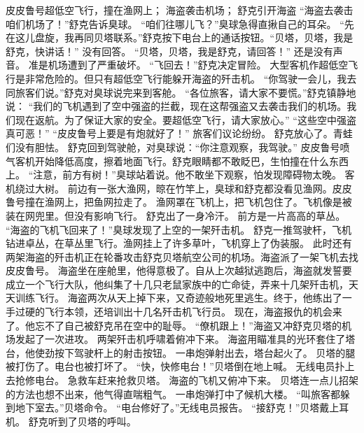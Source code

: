 \documentclass[a4paper,12pt,UTF8,twoside]{ctexbook}
\begin{document}
        皮皮鲁号超低空飞行，撞在渔网上； 
        海盗袭击机场； 
        舒克引开海盗   
        “海盗去袭击咱们机场了！”舒克告诉臭球。 
        “咱们往哪儿飞？”臭球急得直揪自己的耳朵。 
        “先在这儿盘旋，我再同贝塔联系。”舒克按下电台上的通话按钮。“贝塔，贝塔，我是舒克，快讲话！” 
        没有回答。 
        “贝塔，贝塔，我是舒克，请回答！” 
        还是没有声音。 
        准是机场遭到了严重破坏。 
        “飞回去！”舒克决定冒险。 
        大型客机作超低空飞行是非常危险的。但只有超低空飞行能躲开海盗的歼击机。 
        “你驾驶一会儿，我去同旅客们说。”舒克对臭球说完来到客舱。 
        “各位旅客，请大家不要慌。”舒克镇静地说： 
        “我们的飞机遇到了空中强盗的拦截，现在这帮强盗又去袭击我们的机场。我们现在返航。为了保证大家的安全。要超低空飞行，请大家放心。” 
        “这些空中强盗真可恶！” 
        “皮皮鲁号上要是有炮就好了！” 
        旅客们议论纷纷。 
        舒克放心了。青蛙们没有胆怯。 
        舒克回到驾驶舱，对臭球说：“你注意观察，我驾驶。” 
        皮皮鲁号喷气客机开始降低高度，擦着地面飞行。舒克眼睛都不敢眨巴，生怕撞在什么东西上。 
        “注意，前方有树！”臭球站着说。他不敢坐下观察，怕发现障碍物太晚。 
        客机绕过大树。 
        前边有一张大渔网，晾在竹竿上，臭球和舒克都没看见渔网。皮皮鲁号撞在渔网上，把鱼网拉走了。 
        渔网罩在飞机上，把飞机包住了。飞机像是被装在网兜里。但没有影响飞行。 
        舒克出了一身冷汗。 
        前方是一片高高的草丛。 
        “海盗的飞机飞回来了！”臭球发现了上空的一架歼击机。 
        舒克一推驾驶杆，飞机钻进卓丛，在草丛里飞行。渔网挂上了许多草叶，飞机穿上了伪装服。 
        此时还有两架海盗的歼击机正在轮番攻击舒克贝塔航空公司的机场。海盗派了一架飞机去找皮皮鲁号。 
        海盗坐在座舱里，他得意极了。自从上次越狱逃跑后，海盗就发誓要成立一个飞行大队，他纠集了十几只老鼠家族中的亡命徒，弄来十几架歼击机，天天训练飞行。 
        海盗两次从天上掉下来，又奇迹般地死里逃生。终于，他练出了一手过硬的飞行本领，还培训出十几名歼击机飞行员。 
        现在，海盗报仇的机会来了。他忘不了自己被舒克吊在空中的耻辱。 
        “僚机跟上！”海盗又冲舒克贝塔的机场发起了一次进攻。 
        两架歼击机呼啸着俯冲下来。 
        海盗用瞄准具的光环套住了塔台，他使劲按下驾驶杆上的射击按钮。 
        一串炮弹射出去，塔台起火了。 
        贝塔的腿被打伤了。电台也被打坏了。 
        “快，快修电台！”贝塔倒在地上喊。 
        无线电员扑上去抢修电台。 
        急救车赶来抢救贝塔。 
        海盗的飞机又俯冲下来。 
        贝塔连一点儿招架的方法也想不出来，他气得直喘粗气。 
        一串炮弹打中了候机大楼。 
        “叫旅客都躲到地下室去。”贝塔命令。 
        “电台修好了。”无线电员报告。 
        “接舒克！”贝塔戴上耳机。 
        舒克听到了贝塔的呼叫。 
\end{document}
